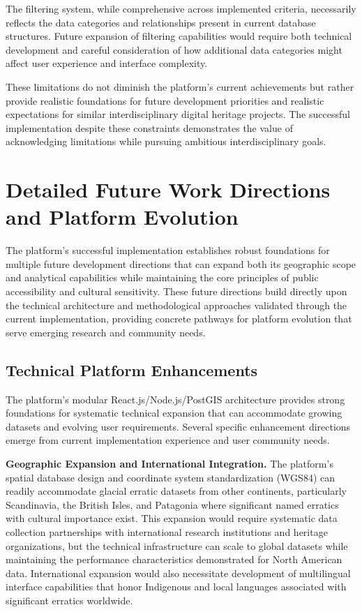 The filtering system, while comprehensive across implemented criteria, necessarily reflects the data categories and relationships present in current database structures. Future expansion of filtering capabilities would require both technical development and careful consideration of how additional data categories might affect user experience and interface complexity.

These limitations do not diminish the platform's current achievements but rather provide realistic foundations for future development priorities and realistic expectations for similar interdisciplinary digital heritage projects. The successful implementation despite these constraints demonstrates the value of acknowledging limitations while pursuing ambitious interdisciplinary goals.

\section{Detailed Future Work Directions and Platform Evolution}
\label{sec:future_work}

The platform's successful implementation establishes robust foundations for multiple future development directions that can expand both its geographic scope and analytical capabilities while maintaining the core principles of public accessibility and cultural sensitivity. These future directions build directly upon the technical architecture and methodological approaches validated through the current implementation, providing concrete pathways for platform evolution that serve emerging research and community needs.

\subsection{Technical Platform Enhancements}
\label{subsec:technical_enhancements}

The platform's modular React.js/Node.js/PostGIS architecture provides strong foundations for systematic technical expansion that can accommodate growing datasets and evolving user requirements. Several specific enhancement directions emerge from current implementation experience and user community needs.

\textbf{Geographic Expansion and International Integration.} The platform's spatial database design and coordinate system standardization (WGS84) can readily accommodate glacial erratic datasets from other continents, particularly Scandinavia, the British Isles, and Patagonia where significant named erratics with cultural importance exist. This expansion would require systematic data collection partnerships with international research institutions and heritage organizations, but the technical infrastructure can scale to global datasets while maintaining the performance characteristics demonstrated for North American data. International expansion would also necessitate development of multilingual interface capabilities that honor Indigenous and local languages associated with significant erratics worldwide.

